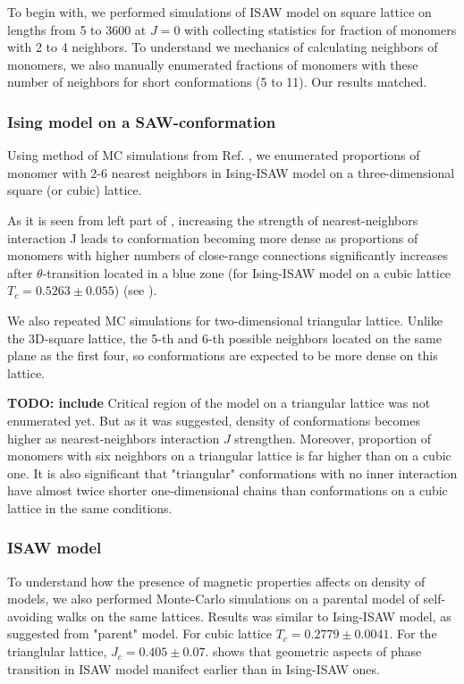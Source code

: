 \documentclass[a4paper]{jpconf}
\begin{document}
To begin with, we performed simulations of ISAW model on square lattice on lengths from 5 to 3600 at $J=0$ with collecting statistics for fraction of monomers with 2 to 4 neighbors. To understand we mechanics of calculating neighbors of monomers, we also manually enumerated fractions of monomers with these number of neighbors for short conformations (5 to 11). Our results matched.


\subsubsection{Ising model on a SAW-conformation}

Using method of MC simulations from Ref. \cite{faizullina2021critical}, we enumerated proportions of monomer with 2-6 nearest neighbors in Ising-ISAW model on a three-dimensional square (or cubic) lattice.

As it is seen from left part of , increasing the strength of nearest-neighbors interaction J leads to conformation becoming more dense as proportions of monomers with higher numbers of close-range connections significantly increases after $\theta$-transition located in a blue zone (for Ising-ISAW model on a cubic lattice $T_{c} = 0.5263 \pm 0.055$\cite{Foster2021}) (see ).

We also repeated MC simulations for two-dimensional triangular lattice. Unlike the 3D-square lattice, the 5-th and 6-th possible neighbors located on the same plane as the first four, so conformations are expected to be more dense on this lattice.


\textbf{TODO: include}
Critical region of the model on a triangular lattice was not enumerated yet. But as it was suggested, density of conformations becomes higher as nearest-neighbors interaction $J$ strengthen. Moreover, proportion of monomers with six neighbors on a triangular lattice is far higher than on a cubic one. It is also significant that "triangular" conformations with no inner interaction have almost twice shorter one-dimensional chains than conformations on a cubic lattice in the same conditions.

\subsubsection{ISAW model}

To understand how the presence of magnetic properties affects on density of models, we also performed Monte-Carlo simulations on a parental model of self-avoiding walks on the same lattices. Results was similar to Ising-ISAW model, as suggested from "parent" model. For cubic lattice $T_{c} = 0.2779\pm 0.0041 $\cite{Tesi1996}. For the trianglular lattice, $J_{c} = 0.405 \pm 0.07 $\cite{Privman1986}.  shows that geometric aspects of phase transition in ISAW model manifect earlier than in Ising-ISAW ones.  
\end{document}

